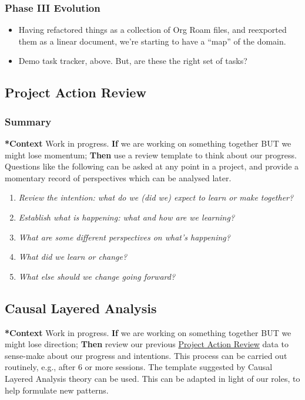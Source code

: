 \documentclass[11pt]{article}
\begin{document}
\subsubsection{Phase III Evolution}
\label{sec:org48d00fb}

\begin{itemize}
\item Having refactored things as a collection of Org Roam files, and reexported them as a linear document, we’re starting to have a ``map'' of the domain.
\item Demo task tracker, above.  But, are these the right set of tasks?
\end{itemize}
\subsection{Project Action Review}
\label{f5a1bc15-5abb-44d6-8f7a-e254974c9002}
\subsubsection{Summary}
\label{sec:orgf126cff}

\textbf{*Context} Work in progress. \textbf{If} we are working on something together
BUT we might lose momentum; \textbf{Then} use a review template to think about
our progress. Questions like the following can be asked at any point in
a project, and provide a momentary record of perspectives which can be
analysed later.

\begin{enumerate}
\item \emph{Review the intention: what do we (did we) expect to learn or make
together?}

\item \emph{Establish what is happening: what and how are we learning?}

\item \emph{What are some different perspectives on what's happening?}

\item \emph{What did we learn or change?}

\item \emph{What else should we change going forward?}
\end{enumerate}
\subsection{Causal Layered Analysis}
\label{56ce8d31-d3d6-4493-bb41-b07d810afbcc}
\textbf{*Context} Work in progress. \textbf{If} we are working on something together BUT
we might lose direction; \textbf{Then} review our previous \hyperref[f5a1bc15-5abb-44d6-8f7a-e254974c9002]{Project Action
Review} data to sense-make about our progress and intentions.  This
process can be carried out routinely, e.g., after 6 or more sessions.
The template suggested by Causal Layered Analysis theory can be used.
This can be adapted in light of our roles, to help formulate new
patterns.
\end{document}
